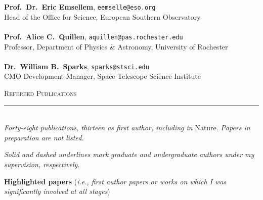 \documentclass[11pt]{article}
\makeatletter
\def\vhrulefill#1{\leavevmode\leaders\hrule\@height#1\hfill \kern\z@}
\makeatother
\begin{document}
{\textbf{Prof.~Dr.~Eric Emsellem}, \texttt{eemselle@eso.org}\\
Head of the Office for Science, European Southern Observatory\\ \\
\textbf{Prof.~Alice C.~Quillen}, \texttt{aquillen@pas.rochester.edu}\\
Professor, Department of Physics \& Astronomy, University of Rochester\\ \\
\textbf{Dr.~William B.~Sparks}, \texttt{sparks@stsci.edu}\\
CMO Development Manager, Space Telescope Science Institute\\
}

\vspace{4mm}


\clearpage

\textsc{Refereed Publications} \vhrulefill{0.4pt}\\


\textit{Forty-eight publications, thirteen as first author, including in} Nature. \textit{Papers in preparation are not listed.}

\textit{Solid and dashed underlines mark graduate and undergraduate authors under my supervision, respectively.}\\

\vspace{-1mm}

\textbf{Highlighted papers} (\textit{i.e., first author papers or works on which I was significantly involved at all stages})\\

\vspace{-4mm}
\end{document}
